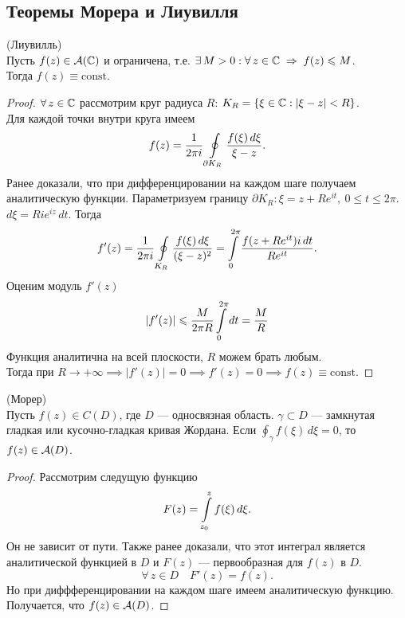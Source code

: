 	\subsection{Теоремы Морера и Лиувилля}
	\begin{theorem*}
		(Лиувилль)\\
		\indent Пусть $f(z)\in\mathcal{A}(\mathbb{C})$ и ограничена, т.е. $\exists\,M>0: \forall\,z\in\mathbb{C}\;\Rightarrow\; f(z)\leqslant M$.\\ Тогда $f(z)\equiv\mathrm{const}$.
	\end{theorem*}
	\begin{proof}
		$\forall\,z\in\mathbb{C}$ рассмотрим круг радиуса $R$: $K_R = \{ \xi\in\mathbb{C}:|\xi-z|<R \}$.\\
		Для каждой точки внутри круга имеем
		\[ f(z) = \frac{1}{2\pi i}\oint\limits_{\partial K_R}\frac{f(\xi)\,d\xi}{\xi - z}. \]
		Ранее доказали, что при дифференцировании на каждом шаге получаем аналитическую функции. Параметризуем границу $\partial K_R: \xi = z+Re^{it},\ 0 \leqslant t\leqslant 2\pi$. $d\xi = Rie^{iz}\,dt$. Тогда
		\[ f'(z) = \frac{1}{2\pi i}\oint\limits_{K_R}\frac{f(\xi)\,d\xi}{(\xi - z)^2} = \int\limits_0^{2\pi}\frac{f(z+Re^{it})i\,dt}{Re^{it}}. \]
		Оценим модуль $f'(z)$
		\[ |f'(z)|\leqslant \frac{M}{2\pi R}\int\limits_0^{2\pi}dt = \frac{M}{R} \]
		Функция аналитична на всей плоскости, $R$ можем брать любым.\\ Тогда
		при $R\to+\infty\implies|f'(z)| = 0\implies f'(z) = 0 \implies f(z) \equiv \mathrm{const}$.
	\end{proof}
	\begin{theorem*}
		(Морер)\\
		\indent Пусть $f(z)\in C(D)$, где $D$ --- односвязная область. $\gamma\subset D$ ---  замкнутая гладкая или кусочно-гладкая кривая Жордана. Если $\displaystyle\oint_\gamma f(\xi)\,d\xi = 0 $, то $f(z)\in\mathcal{A}(D)$.
	\end{theorem*}
	\begin{proof}
		Рассмотрим следущую функцию
		\[ F(z) = \int\limits_{z_0}^z f(\xi)\,d\xi. \]
		Он не зависит от пути. Также ранее доказали, что этот интеграл является аналитической функцией в $D$ и $F(z)$ --- первообразная для $f(z)$ в $D$.
		\[ \forall\,z\in D\quad F'(z) = f(z). \]
		Но при диффференцировании на каждом шаге имеем аналитическую функцию. Получается, что $f(z)\in\mathcal{A}(D)$.
	\end{proof}
